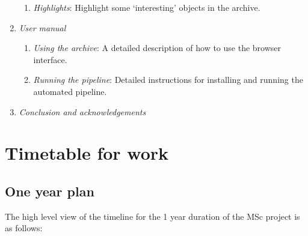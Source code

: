 \documentclass[a4paper,10pt]{article}
\begin{document}
\begin{enumerate}
\begin{enumerate}
	      \item \emph{Highlights}: Highlight some `interesting' objects in the archive. 
	\end{enumerate}
	\item \emph{User manual}
	\begin{enumerate}
	      \item \emph{Using the archive}: A detailed description of how to use the browser interface. 
	      \item \emph{Running the pipeline}: Detailed instructions for installing and running the automated pipeline.  
	\end{enumerate}
	\item \emph{Conclusion and acknowledgements}
\end{enumerate}      



\section{Timetable for work}

\subsection{One year plan} 
The high level view of the timeline for the 1 year duration of the MSc project is as follows:
\end{document}
